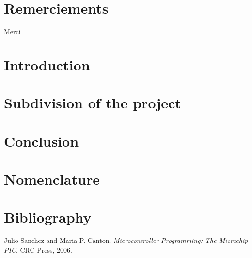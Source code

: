 \documentclass[12pt]{article}
\begin{document}


\emptyPage

\section*{Remerciements}

Merci

\emptyPage

\tableofcontents


\newpage
{}

\section{Introduction}

	
\newpage
\section{Subdivision of the project}

	

	\begin{center}
	
	\end{center}
	
	 \cite{EEPROM}


	

\newpage
\section{Conclusion}
	


\newpage
\section{Nomenclature}
	\printnomenclature

\newpage
\section{Bibliography}

	\begin{thebibliography}{9}
	Julio Sanchez and Maria P. Canton.
	\textit{Microcontroller Programming: The Microchip PIC}. 
	CRC Press, 2006.
	\end{thebibliography}
\end{document}
